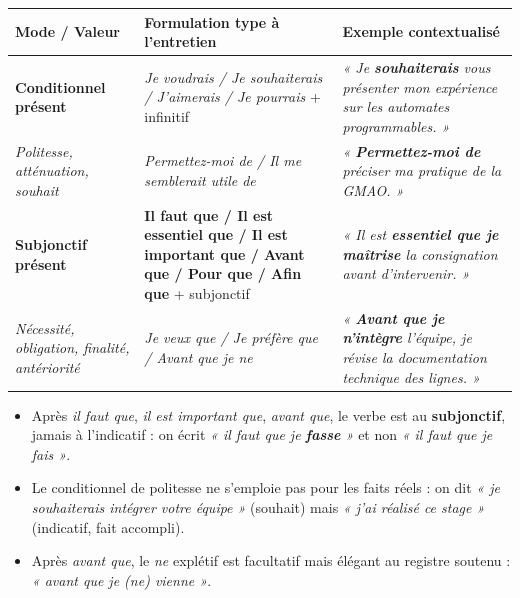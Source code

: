 \documentclass[11pt]{article}
\begin{document}
\begin{aretenir}
\begin{tabularx}{\linewidth}{|l|X|X|}
\hline
\textbf{Mode / Valeur} & \textbf{Formulation type à l'entretien} & \textbf{Exemple contextualisé} \\
\hline
\textbf{Conditionnel présent} & \emph{Je voudrais / Je souhaiterais / J'aimerais / Je pourrais} + infinitif & \emph{« Je \textbf{souhaiterais} vous présenter mon expérience sur les automates programmables. »} \\
\textit{Politesse, atténuation, souhait} & \emph{Permettez-moi de / Il me semblerait utile de} & \emph{« \textbf{Permettez-moi de} préciser ma pratique de la GMAO. »} \\
\hline
\textbf{Subjonctif présent} & \textbf{Il faut que / Il est essentiel que / Il est important que / Avant que / Pour que / Afin que} + subjonctif & \emph{« Il est \textbf{essentiel que je maîtrise} la consignation avant d'intervenir. »} \\
\textit{Nécessité, obligation, finalité, antériorité} & \emph{Je veux que / Je préfère que / Avant que je ne} & \emph{« \textbf{Avant que je n'intègre} l'équipe, je révise la documentation technique des lignes. »} \\
\hline
\end{tabularx}
\end{aretenir}

\begin{attention}
\begin{itemize}
    \item Après \emph{il faut que}, \emph{il est important que}, \emph{avant que}, le verbe est au \textbf{subjonctif}, jamais à l'indicatif : on écrit \emph{« il faut que je \textbf{fasse} »} et non \emph{« il faut que je fais »}.
    \item Le conditionnel de politesse ne s'emploie pas pour les faits réels : on dit \emph{« je souhaiterais intégrer votre équipe »} (souhait) mais \emph{« j'ai réalisé ce stage »} (indicatif, fait accompli).
    \item Après \emph{avant que}, le \emph{ne} explétif est facultatif mais élégant au registre soutenu : \emph{« avant que je (ne) vienne »}.
\end{itemize}
\end{attention}
\end{document}
